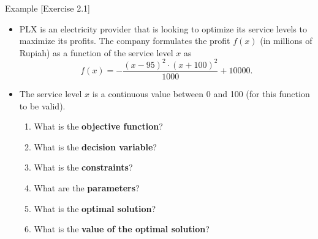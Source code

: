 \documentclass [xcolor=svgnames, handout]{beamer}
\begin{document}
\begin{frame}{Example [Exercise 2.1]}
    \begin{itemize}[<.->]
        \item PLX is an electricity provider that is looking to optimize its service levels to maximize its profits. The company formulates the profit $f(x)$ (in millions of Rupiah) as a function of the service level $x$ as 
        \begin{equation}
            f(x) = -\frac{(x-95)^2 \cdot (x+100)^2}{1000} + 10000.
            \label{eq:PLX_profit_function}
        \end{equation}
    
        \item The service level $x$ is a continuous value between 0 and 100 (for this function to be valid).
        \begin{enumerate}[<.->]
            \item What is the \textbf{objective function}?
            \item What is the \textbf{decision variable}?
            \item What is the \textbf{constraints}?
            \item What are the \textbf{parameters}?
            \item What is the \textbf{optimal solution}? 
            \item What is the \textbf{value of the optimal solution}?
        \end{enumerate}
    \end{itemize}
\end{frame}
\end{document}
